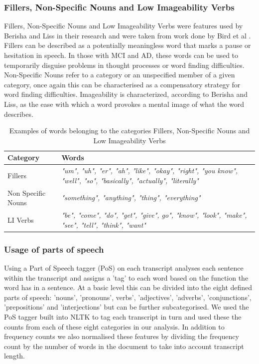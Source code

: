 \documentclass[12pt]{article}
\begin{document}
\subsubsection{Fillers, Non-Specific Nouns and Low Imageability Verbs}
Fillers, Non-Specific Nouns and Low Imageability Verbs were features used by Berisha and Liss in their research \cite{Berisha2015} and were taken from work done by Bird et al \cite{Bird2000}. Fillers can be described as a potentially meaningless word that marks a pause or hesitation in speech. In those with MCI and AD, these words can be used to temporarily disguise problems in thought processes or word finding difficulties. Non-Specific Nouns refer to a category or an unspecified member of a given category, once again this can be characterised as a compensatory strategy for word finding difficulties. Imageability is characterized, according to Berisha and Liss\cite{Berisha2015}, as the ease with which a word provokes a mental image of what the word describes. 

\begin{table}[H]
	\begin{center}
	\begin{tabular}{ | p{3cm} | p{10cm} |}
		\hline
		Category & Words \\ \hline
		Fillers & \textit{"um", "uh", "er", "ah", "like", "okay", "right",  "you know", "well", "so", "basically", "actually", "literally"} \\ \hline
		Non Specific Nouns & \textit{"something", "anything", "thing", "everything"} \\ \hline
		LI Verbs & \textit{"be", "come", "do", "get", "give", go", "know", "look", "make", "see", "tell", "think", "want"} \\ \hline
	\end{tabular}
	\caption{\label{tab:table-name}Examples of words belonging to the categories Fillers, Non-Specific Nouns and Low Imageability Verbs}
	\end{center} 
\end{table}

\subsubsection{Usage of parts of speech}
Using a Part of Speech tagger (PoS) on each transcript analyses each sentence within the transcript and assigns a 'tag' to each word based on the function the word has in a sentence. At a basic level this can be divided into the eight defined parts of speech: 'nouns', 'pronouns', verbs', 'adjectives', 'adverbs', 'conjunctions', 'prepositions' and 'interjections' but can be further subcategorised. We used the PoS tagger built into NLTK to tag each transcript in turn and used these the counts from each of these eight categories in our analysis. In addition to frequency counts we also normalised these features by dividing the frequency count by the number of words in the document to take into account transcript length.
\end{document}
